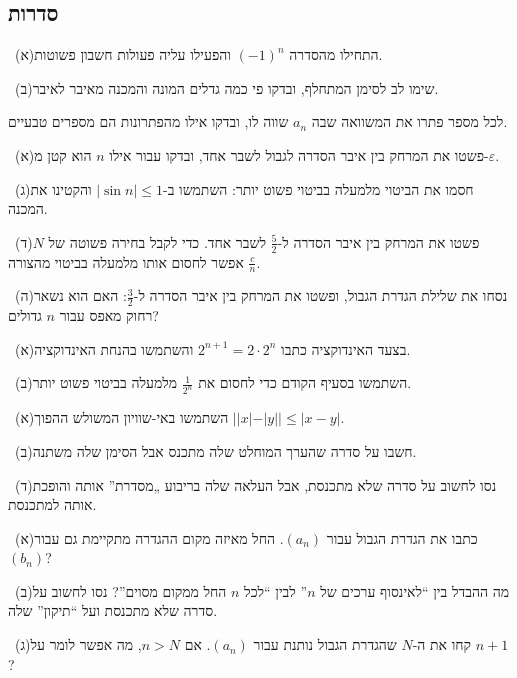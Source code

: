 \documentclass[12pt, a4paper]{article}
\begin{document}
\subsection*{סדרות}
\noindent {}\ (א)\enskip התחילו מהסדרה $(-1)^n$ והפעילו עליה פעולות חשבון פשוטות.\par\smallskip
\noindent {}\ (ב)\enskip שימו לב לסימן המתחלף, ובדקו פי כמה גדלים המונה והמכנה מאיבר לאיבר.\par\smallskip
\noindent {}\enskip לכל מספר פתרו את המשוואה שבה $a_n$ שווה לו, ובדקו אילו מהפתרונות הם מספרים טבעיים.\par\smallskip
\noindent {}\ (א)\enskip פשטו את המרחק בין איבר הסדרה לגבול לשבר אחד, ובדקו עבור אילו $n$ הוא קטן מ-$\varepsilon$.\par\smallskip
\noindent {}\ (ג)\enskip חסמו את הביטוי מלמעלה בביטוי פשוט יותר: השתמשו ב-$|\sin n|\le1$ והקטינו את המכנה.\par\smallskip
\noindent {}\ (ד)\enskip פשטו את המרחק בין איבר הסדרה ל-$\frac52$ לשבר אחד. כדי לקבל בחירה פשוטה של $N$ אפשר לחסום אותו מלמעלה בביטוי מהצורה $\frac{c}{n}$.\par\smallskip
\noindent {}\ (ה)\enskip נסחו את שלילת הגדרת הגבול, ופשטו את המרחק בין איבר הסדרה ל-$\frac32$: האם הוא נשאר רחוק מאפס עבור $n$ גדולים?\par\smallskip
\noindent {}\ (א)\enskip בצעד האינדוקציה כתבו $2^{n+1}=2\cdot2^n$ והשתמשו בהנחת האינדוקציה.\par\smallskip
\noindent {}\ (ב)\enskip השתמשו בסעיף הקודם כדי לחסום את $\frac{1}{2^n}$ מלמעלה בביטוי פשוט יותר.\par\smallskip
\noindent {}\ (א)\enskip השתמשו באי-שוויון המשולש ההפוך $||x|-|y||\le |x-y|$.\par\smallskip
\noindent {}\ (ב)\enskip חשבו על סדרה שהערך המוחלט שלה מתכנס אבל הסימן שלה משתנה.\par\smallskip
\noindent {}\ (ד)\enskip נסו לחשוב על סדרה שלא מתכנסת, אבל העלאה שלה בריבוע „מסדרת” אותה והופכת אותה למתכנסת.\par\smallskip
\noindent {}\ (א)\enskip כתבו את הגדרת הגבול עבור $(a_n)$. החל מאיזה מקום ההגדרה מתקיימת גם עבור $(b_n)$?\par\smallskip
\noindent {}\ (ב)\enskip מה ההבדל בין ``לאינסוף ערכים של $n$'' לבין ``לכל $n$ החל ממקום מסוים''? נסו לחשוב על סדרה שלא מתכנסת ועל ``תיקון'' שלה.\par\smallskip
\noindent {}\ (ג)\enskip קחו את ה-$N$ שהגדרת הגבול נותנת עבור $(a_n)$. אם $n>N$, מה אפשר לומר על $n+1$?\par\smallskip
\end{document}
